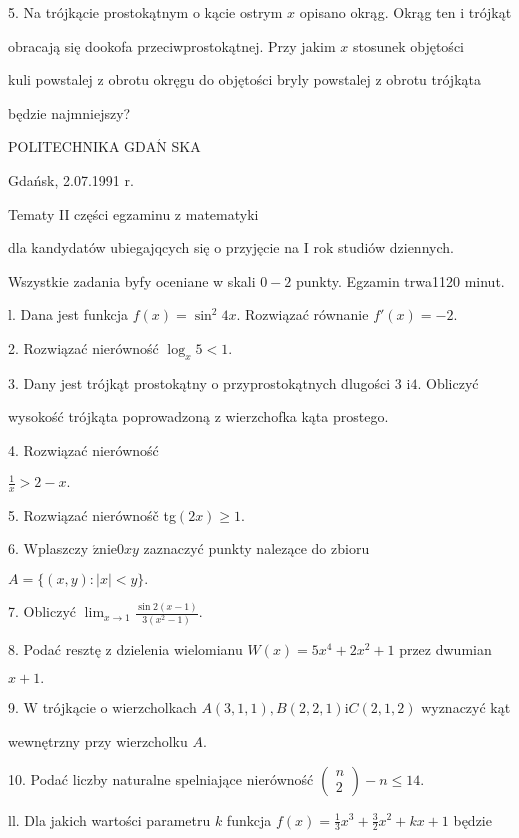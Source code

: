 \documentclass[a4paper,12pt]{article}
\begin{document}
5. Na trójkącie prostokątnym o kącie ostrym $x$ opisano okrąg. Okrąg ten i trójkąt

obracają się dookofa przeciwprostokątnej. Przy jakim $x$ stosunek objętości

kuli powstalej z obrotu okręgu do objętości bryly powstalej z obrotu trójkąta

będzie najmniejszy?




POLITECHNIKA $\mathrm{G}\mathrm{D}\mathrm{A}\acute{\mathrm{N}}$ SKA

Gdańsk, 2.07.1991 r.

Tematy II części egzaminu z matematyki

dla kandydatów ubiegajqcych się o przyjęcie na I rok studiów dziennych.

Wszystkie zadania byfy oceniane w skali $0-2$ punkty. Egzamin trwa1120 minut.

l. Dana jest funkcja $f(x)=\sin^{2}4x$. Rozwiązać równanie $f'(x)=-2.$

2. Rozwiązać nierówność $\log_{x}5<1.$

3. Dany jest trójkąt prostokątny o przyprostokątnych dlugości 3 $\mathrm{i}4$. Obliczyć

wysokość trójkąta poprowadzoną z wierzchofka kąta prostego.

4. Rozwiązać nierówność

$\displaystyle \frac{1}{x}>2-x.$

5. Rozwiązać nierównośč tg$(2x)\geq 1.$

6. $\mathrm{W}\mathrm{p}$laszczy $\acute{\mathrm{z}}\mathrm{n}\mathrm{i}\mathrm{e}0xy$ zaznaczyć punkty nalezące do zbioru

$A=\{(x,y):|x|<y\}.$

7. Obliczyć $\displaystyle \lim_{x\rightarrow 1}\frac{\sin 2(x-1)}{3(x^{2}-1)}.$

8. Podać resztę z dzielenia wielomianu $W(x) = 5x^{4}+2x^{2}+1$ przez dwumian

$x+1.$

9. $\mathrm{W}$ trójkącie o wierzcholkach $A(3,1,1), B(2,2,1) \mathrm{i}C(2,1,2)$ wyznaczyć kąt

wewnętrzny przy wierzcholku $A.$

10. Podać liczby naturalne spelniające nierówność $\left(\begin{array}{l}
n\\
2
\end{array}\right) -n\leq 14.$

ll. Dla jakich wartości parametru $k$ funkcja $f(x) = \displaystyle \frac{1}{3}x^{3}+\frac{3}{2}x^{2}+kx+1$ będzie
\end{document}
